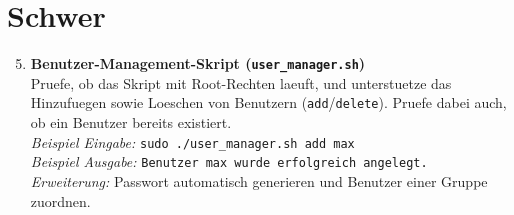 \documentclass[11pt, oneside, numbers=noenddot]{scrbook}
\begin{document}
\section{Schwer}
\begin{enumerate}
\setcounter{enumi}{4}
\item \textbf{Benutzer-Management-Skript (\texttt{user\_manager.sh})}\\
Pruefe, ob das Skript mit Root-Rechten laeuft, und unterstuetze das Hinzufuegen sowie Loeschen von Benutzern (\texttt{add}/\texttt{delete}). Pruefe dabei auch, ob ein Benutzer bereits existiert.\\
\textit{Beispiel Eingabe:} \texttt{sudo ./user\_manager.sh add max}\\
\textit{Beispiel Ausgabe:} \texttt{Benutzer max wurde erfolgreich angelegt.}\\
\textit{Erweiterung:} Passwort automatisch generieren und Benutzer einer Gruppe zuordnen.
\end{enumerate}
\end{document}
